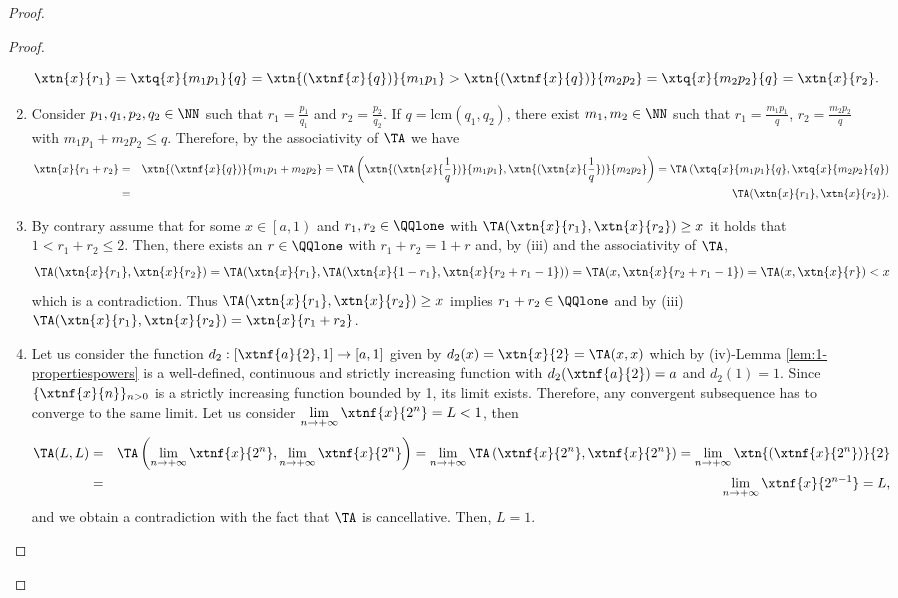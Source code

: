 \begin{proof}
\begin{proof}
\begin{enumerate}[label=(\roman*)]
			$$\xtn{x}{r_1} = \xtq{x}{m_1p_1}{q} = \xtn{(\xtnf{x}{q})}{m_1p_1} >  \xtn{(\xtnf{x}{q})}{m_2p_2} = \xtq{x}{m_2p_2}{q} = \xtn{x}{r_2}.$$
			\item Consider $p_1,q_1,p_2,q_2 \in \NN$ such that $r_1=\frac{p_1}{q_1}$ and $r_2=\frac{p_2}{q_2}$. If $q=\text{lcm}(q_1,q_2)$, there exist $m_1,m_2 \in \NN$ such that $r_1 =\frac{m_1p_1}{q}$, $r_2 = \frac{m_2p_2}{q}$ with $m_1p_1+ m_2p_2 \leq q$. Therefore, by the associativity of $\TA$ we have
			\begin{eqnarray*}
				\xtn{x}{r_1+r_2} &=& \xtn{(\xtnf{x}{q})}{m_1p_1+m_2p_2} =
				\TA\left(\xtn{(\xtn{x}{\frac{1}{q}})}{m_1p_1},\xtn{(\xtn{x}{\frac{1}{q}})}{m_2p_2}\right) = \TA\left(\xtq{x}{m_1p_1}{q},\xtq{x}{m_2p_2}{q}\right) \\
				&=& \TA(\xtn{x}{r_1},\xtn{x}{r_2}).
			\end{eqnarray*}
			\item By contrary assume that for some $x \in \left[a,1\right)$ and $r_1,r_2 \in \QQlone$ with  $\TA(\xtn{x}{r_1},\xtn{x}{r_2}) \geq x$ it holds that $1 < r_1+r_2 \leq 2$. Then, there exists an $r \in \QQlone$ with $r_1+r_2=1+r$ and, by (iii) and the associativity of $\TA$,
			$$\TA(\xtn{x}{r_1},\xtn{x}{r_2}) = \TA(\xtn{x}{r_1},\TA(\xtn{x}{1-r_1},\xtn{x}{r_2+r_1-1})) = \TA(x,\xtn{x}{r_2+r_1-1}) = \TA(x,\xtn{x}{r}) <x$$ which is a contradiction. Thus $\TA(\xtn{x}{r_1},\xtn{x}{r_2})\geq x$ implies  $r_1+r_2 \in \QQlone$ and by (iii) $\TA(\xtn{x}{r_1},\xtn{x}{r_2})=\xtn{x}{r_1+r_2}$. 	
			\item Let us consider the function $d_2 : [\xtnf{a}{2},1] \to [a,1]$ given by $d_2(x)=\xtn{x}{2}=\TA(x,x)$ which by (iv)-Lemma \ref{lem:1-propertiespowers} is a well-defined, continuous and strictly increasing function with $d_2(\xtnf{a}{2})=a$ and $d_2(1)=1$. Since $\{\xtnf{x}{n}\}_{n>0}$ is a strictly increasing function bounded by 1, its limit exists. Therefore, any convergent subsequence has to converge to the same limit. Let us consider $ \displaystyle \lim_{n \to + \infty} \xtnf{x}{2^n}=L<1$, then
			\begin{eqnarray*}
				\displaystyle \TA(L,L) &=& \TA\left(\lim_{n \to + \infty} \xtnf{x}{2^n},\lim_{n \to + \infty} \xtnf{x}{2^n}\right) = \lim_{n \to + \infty} \TA\left(\xtnf{x}{2^n},\xtnf{x}{2^n}\right) = \lim_{n \to + \infty} \xtn{(\xtnf{x}{2^n})}{2} \\
				&=& \lim_{n \to + \infty} \xtnf{x}{2^{n-1}} = L,
			\end{eqnarray*}
			and we obtain a contradiction with the fact that $\TA$ is cancellative. Then, $L=1$.

\end{enumerate}
\end{proof}
\end{proof}
